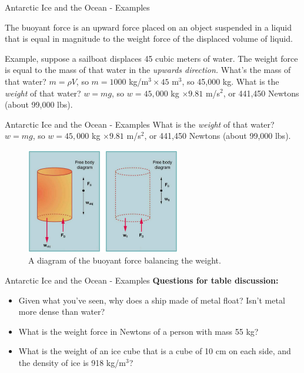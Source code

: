 \documentclass{beamer}
\begin{document}
\begin{frame}{Antarctic Ice and the Ocean - Examples}
\begin{tcolorbox}[colback=white,colframe=red!40!blue,title=The buoyant force]
\alert{The buoyant force is an upward force placed on an object suspended in a liquid that is equal in magnitude to the weight force of the displaced volume of liquid.}
\end{tcolorbox}
Example, suppose a sailboat displaces 45 cubic meters of water.  The weight force is equal to the mass of that water in the \textit{upwards direction.}  What's the mass of that water?  $m = \rho V$, so $m = 1000$ kg/m$^3 \times 45$ m$^3$, so 45,000 kg.  What is the \textit{weight} of that water?  $w = mg$, so $w = 45,000$ kg $\times 9.81$ m/s$^2$, or 441,450 Newtons (about 99,000 lbs).
\end{frame}

\begin{frame}{Antarctic Ice and the Ocean - Examples}
What is the \textit{weight} of that water?  $w = mg$, so $w = 45,000$ kg $\times 9.81$ m/s$^2$, or 441,450 Newtons (about 99,000 lbs).
\begin{figure}
\centering
\includegraphics[width=0.6\textwidth]{buoy.png}
\caption{\label{fig:buoy} A diagram of the buoyant force balancing the weight.}
\end{figure}
\end{frame}

\begin{frame}{Antarctic Ice and the Ocean - Examples}
\textbf{Questions for table discussion:}
\begin{itemize}
\item Given what you've seen, why does a ship made of metal float?  Isn't metal more dense than water?
\item What is the weight force in Newtons of a person with mass 55 kg?
\item What is the weight of an ice cube that is a cube of 10 cm on each side, and the density of ice is 918 kg/m$^3$?
\end{itemize}
\end{frame}
\end{document}
